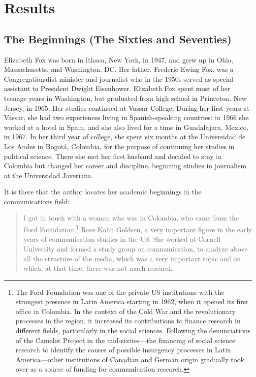 \documentclass{tufte-handout}
\begin{document}
\hypertarget{results}{%
\section{Results}\label{results}}

\hypertarget{the-beginnings-the-sixties-and-seventies}{%
\subsection{The Beginnings (The Sixties and
Seventies)}\label{the-beginnings-the-sixties-and-seventies}}

Elizabeth Fox was born in Ithaca, New York, in 1947, and grew up in
Ohio, Massachusetts, and Washington, DC. Her father, Frederic Ewing Fox,
was a Congregationalist minister and journalist who in the 1950s served
as special assistant to President Dwight Eisenhower. Elizabeth Fox spent
most of her teenage years in Washington, but graduated from high school
in Princeton, New Jersey, in 1965. Her studies continued at Vassar
College. During her first years at Vassar, she had two experiences
living in Spanish-speaking countries: in 1966 she worked at a hotel in
Spain, and she also lived for a time in Guadalajara, Mexico, in 1967. In
her third year of college, she spent six months at the Universidad de
Los Andes in Bogotá, Colombia, for the purpose of continuing her studies
in political science. There she met her first husband and decided to
stay in Colombia but changed her career and discipline, beginning
studies in journalism at the Universidad Javeriana.

It is there that the author locates her academic beginnings in the
communications field:

\begin{quote}
I got in touch with a woman who was in Colombia, who came from the Ford
Foundation,\footnote{The Ford Foundation was one of the private US
  institutions with the strongest presence in Latin America starting in
  1962, when it opened its first office in Colombia. In the context of
  the Cold War and the revolutionary processes in the region, it
  increased its contributions to finance research in different fields,
  particularly in the social sciences. Following the denunciations of
  the Camelot Project in the mid-sixties---the financing of social
  science research to identify the causes of possible insurgency
  processes in Latin America---other institutions of Canadian and German
  origin gradually took over as a source of funding for communication
  research.} Rose Kohn Goldsen, a very important figure in the early
years of communication studies in the US. She worked at Cornell
University and formed a study group on communication, to analyze above
all the structure of the media, which was a very important topic and on
which, at that time, there was not much research.
\end{quote}
\end{document}
